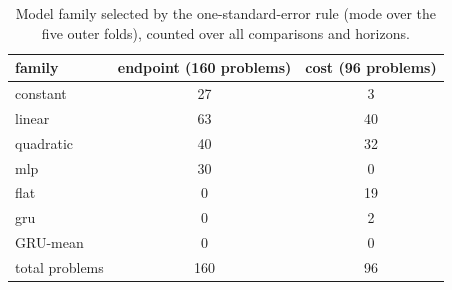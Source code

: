 \begin{table}[htbp]
\centering
\small
\caption{Model family selected by the one-standard-error rule (mode over the five outer folds), counted over all comparisons and horizons.}\label{tab:selection}
\begin{tabular}{l cc}
\toprule
family & endpoint (160 problems) & cost (96 problems) \\
\midrule
constant & 27 & 3 \\
linear & 63 & 40 \\
quadratic & 40 & 32 \\
mlp & 30 & 0 \\
flat & 0 & 19 \\
gru & 0 & 2 \\
GRU-mean & 0 & 0 \\
total problems & 160 & 96 \\
\bottomrule
\end{tabular}
\end{table}